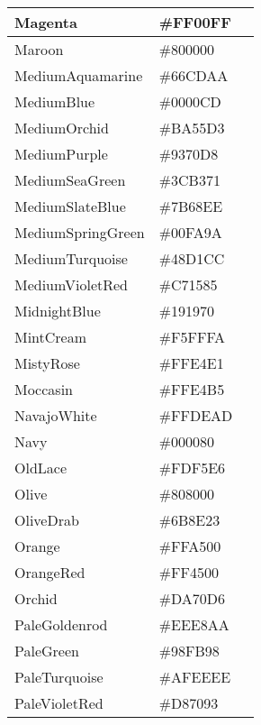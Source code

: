 \begin{longtable}{|p{100pt}|p{100pt}|p{100pt}|}
\hline
Magenta		&\#FF00FF	 &\cellcolor{Magenta}\\
\hline
Maroon		&\#800000&\cellcolor{Maroon}	 \\
\hline
MediumAquamarine	&\#66CDAA	 &\cellcolor{MediumAquamarine}\\
\hline
MediumBlue	&\#0000CD	 &\cellcolor{MediumBlue}\\
\hline
MediumOrchid	&\#BA55D3	 &\cellcolor{MediumOrchid}\\
\hline
MediumPurple	&\#9370D8	 &\cellcolor{MediumPurple}\\
\hline
MediumSeaGreen	&\#3CB371&\cellcolor{MediumSeaGreen}	 \\
\hline
MediumSlateBlue	&\#7B68EE	 &\cellcolor{MediumSlateBlue}\\
\hline
MediumSpringGreen&\#00FA9A	 &\cellcolor{MediumSpringGreen}\\
\hline
MediumTurquoise	&\#48D1CC	 &\cellcolor{MediumTurquoise}\\
\hline
MediumVioletRed	&\#C71585	 &\cellcolor{MediumVioletRed}\\
\hline
MidnightBlue		&\#191970	 &\cellcolor{MidnightBlue}\\
\hline
MintCream		&\#F5FFFA	 &\cellcolor{MintCream}\\
\hline
MistyRose		&\#FFE4E1	 &\cellcolor{MistyRose}\\
\hline
Moccasin			&\#FFE4B5	 &\cellcolor{Moccasin}\\
\hline
NavajoWhite		&\#FFDEAD&\cellcolor{NavajoWhite}	 \\
\hline
Navy			&\#000080	 &\cellcolor{Navy}\\
\hline
OldLace			&\#FDF5E6	 &\cellcolor{OldLace}\\
\hline
Olive			&\#808000&\cellcolor{Olive}	 \\
\hline
OliveDrab		&\#6B8E23&\cellcolor{OliveDrab}	 \\
\hline
Orange			&\#FFA500	 &\cellcolor{Orange}\\
\hline
OrangeRed		&\#FF4500	&\cellcolor{OrangeRed} \\
\hline
Orchid			&\#DA70D6	 &\cellcolor{Orchid}\\
\hline
PaleGoldenrod	&\#EEE8AA	&\cellcolor{PaleGoldenrod} \\
\hline
PaleGreen		&\#98FB98	 &\cellcolor{PaleGreen}\\
\hline
PaleTurquoise		&\#AFEEEE	 &\cellcolor{PaleTurquoise}\\
\hline
PaleVioletRed		&\#D87093&\cellcolor{PaleVioletRed}	 \\

\end{longtable}
